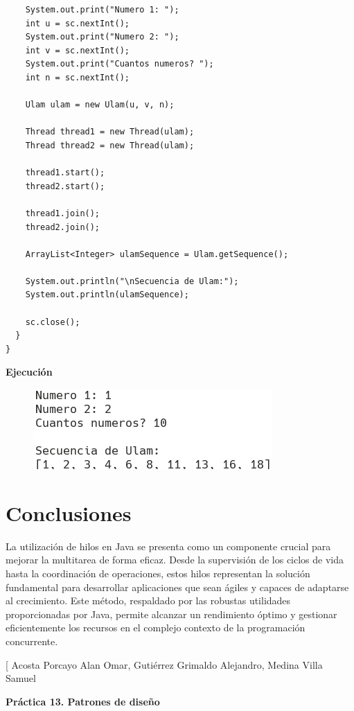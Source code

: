 \documentclass[11pt, twocolumn]{article}
\newcommand{\linejump}{\hfill \break}
\begin{document}
\begin{lstlisting}
    System.out.print("Numero 1: ");
    int u = sc.nextInt();
    System.out.print("Numero 2: ");
    int v = sc.nextInt();
    System.out.print("Cuantos numeros? ");
    int n = sc.nextInt();

    Ulam ulam = new Ulam(u, v, n);

    Thread thread1 = new Thread(ulam);
    Thread thread2 = new Thread(ulam);

    thread1.start();
    thread2.start();

    thread1.join();
    thread2.join();

    ArrayList<Integer> ulamSequence = Ulam.getSequence();

    System.out.println("\nSecuencia de Ulam:");
    System.out.println(ulamSequence);

    sc.close();
  }
}
  \end{lstlisting}

  \newpage
  \textbf{Ejecución}
  \begin{figure}[h!] 
    \centering
    \includegraphics[width=0.8\columnwidth]{12P3.png}
  \end{figure}

  \section*{Conclusiones}
  La utilización de hilos en Java se presenta como un componente crucial para mejorar la multitarea de forma eficaz. Desde la supervisión de los ciclos de vida hasta la coordinación de operaciones, estos hilos representan la solución fundamental para desarrollar aplicaciones que sean ágiles y capaces de adaptarse al crecimiento. Este método, respaldado por las robustas utilidades proporcionadas por Java, permite alcanzar un rendimiento óptimo y gestionar eficientemente los recursos en el complejo contexto de la programación concurrente.

  \twocolumn[
    \centering
    Acosta Porcayo Alan Omar, Gutiérrez Grimaldo Alejandro, Medina Villa Samuel

    \linejump
    
    \textbf{\LARGE{Práctica 13. Patrones de diseño}} \\
\end{document}
